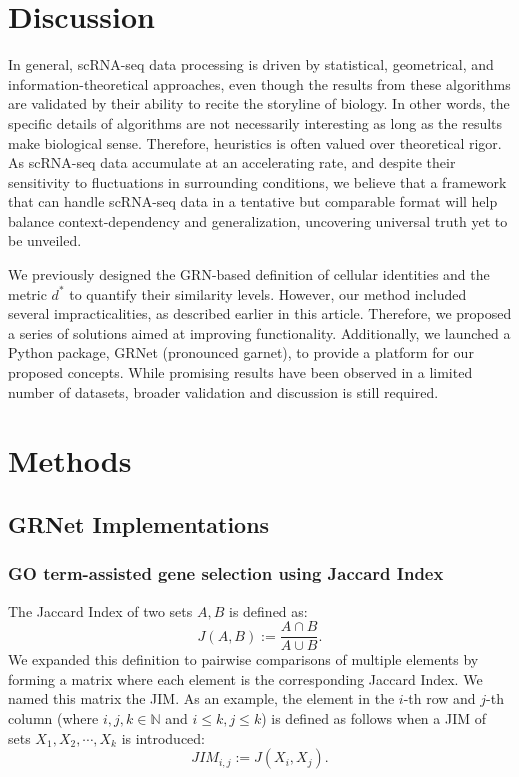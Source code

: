 \documentclass{article}
\begin{document}
\section*{Discussion}
In general, scRNA-seq data processing is driven by statistical, geometrical, and information-theoretical approaches, 
even though the results from these algorithms are validated by their ability to recite the storyline of biology. In 
other words, the specific details of algorithms are not necessarily interesting as long as the results make biological sense. Therefore, 
heuristics is often valued over theoretical rigor. As scRNA-seq data accumulate at an accelerating rate, 
and despite their sensitivity to fluctuations in surrounding conditions, we believe that a framework that can handle 
scRNA-seq data in a tentative but comparable format will help balance context-dependency and generalization, 
uncovering universal truth yet to be unveiled.

We previously designed the GRN-based definition of cellular identities and the metric $d^*$ to quantify their 
similarity levels. However, our method included several impracticalities, as described earlier in this article. Therefore, 
we proposed a series of solutions aimed at improving functionality. Additionally, we launched a Python package, 
GRNet (pronounced garnet), to provide a platform for our proposed concepts. While promising results have been 
observed in a limited number of datasets, broader validation and discussion is still required.

\section*{Methods}
\subsection*{GRNet Implementations}

\subsubsection*{GO term-assisted gene selection using Jaccard Index}
The Jaccard Index of two sets $A, B$ is defined as:
\begin{equation}\label{jaccard}
  J(A, B) := \frac{A\cap B}{A\cup B}.
\end{equation}
We expanded this definition to pairwise comparisons of multiple elements by forming a matrix where each element is 
the corresponding Jaccard Index. We named this matrix the \ac{JIM}. As an example, the 
element in the $i$-th row and $j$-th column (where $i, j, k\in\mathbb{N}$ and $i\leq k, j\leq k$) is defined as follows when a JIM of 
sets $X_1, X_2,\cdots, X_k$ is introduced:
\begin{equation}\label{jim}
  JIM_{i, j} := J(X_i, X_j).
\end{equation}
\end{document}
